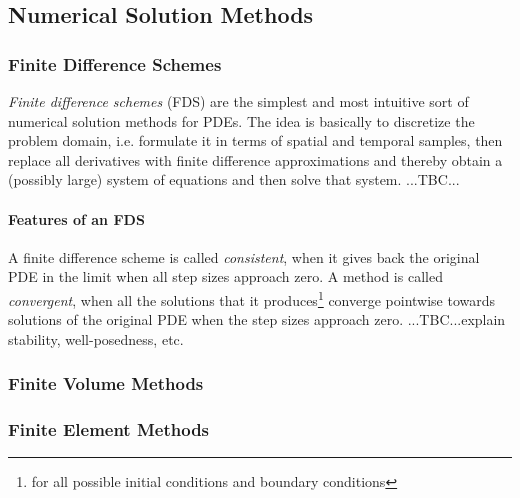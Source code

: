 
\subsection{Numerical Solution Methods}



\subsubsection{Finite Difference Schemes}
\emph{Finite difference schemes} (FDS) are the simplest and most intuitive sort of numerical solution methods for PDEs. The idea is basically to discretize the problem domain, i.e. formulate it in terms of spatial and temporal samples, then replace all derivatives with finite difference approximations and thereby obtain a (possibly large) system of equations and then solve that system. ...TBC...


\paragraph{Features of an FDS}
A finite difference scheme is called \emph{consistent}, when it gives back the original PDE in the limit when all step sizes approach zero. A method is called \emph{convergent}, when all the solutions that it produces\footnote{for all possible initial conditions and boundary conditions} converge pointwise towards solutions of the original PDE when the step sizes approach zero. ...TBC...explain stability, well-posedness, etc.




\subsubsection{Finite Volume Methods}

\subsubsection{Finite Element Methods}



